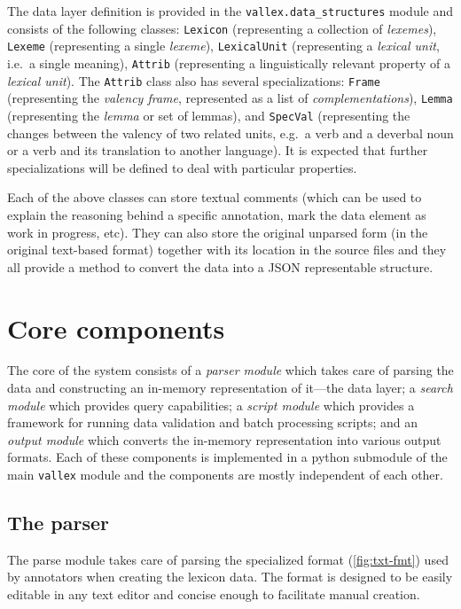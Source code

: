 \documentclass[10pt, a4paper]{article}
\newcommand{\py}[1]{{\tt #1}}
\begin{document}
The data layer definition is provided in the \py{vallex.data\_structures} module and consists of the
following classes:
\py{Lexicon} (representing a collection of \emph{lexemes}), \py{Lexeme} (representing
a single \emph{lexeme}), \py{LexicalUnit} (representing a \emph{lexical unit}, i.e.\ a single meaning), \py{Attrib} (representing a linguistically relevant property of a \emph{lexical unit}). The \py{Attrib} class also has several specializations:
\py{Frame} (representing the \emph{valency frame}, represented as a list of \emph{complementations}),
\py{Lemma} (representing the \emph{lemma} or set of lemmas), and
\py{SpecVal} (representing the changes between the valency of two related units,
e.g.\ a verb and a deverbal noun or a verb and its translation to another language).
It is expected that further specializations
will be defined to deal with particular properties.

Each of the above classes can store textual comments (which can be used to explain
the reasoning behind a specific annotation, mark the data element as work in progress, etc). They can also
store the original unparsed form (in the original text-based format) together with its location in the
source files and they all provide a method to convert the data into a JSON representable structure.

\section{Core components}
The core of the system consists of a \emph{parser module} which takes care of parsing the data and
constructing an in-memory representation of it---the data layer; a \emph{search module} which
provides query capabilities; a \emph{script module} which provides a framework for running data validation
and batch processing scripts; and an \emph{output module} which converts the in-memory representation into
various output formats. Each of these components is implemented in a python submodule of the main \py{vallex}
module and the components are mostly independent of each other.

\subsection{The parser}
The parse module takes care of parsing the specialized format (\autoref{fig:txt-fmt}) used by annotators when creating the lexicon data. The format %
is designed to be easily editable in any text editor and concise enough to facilitate manual creation.
\end{document}
